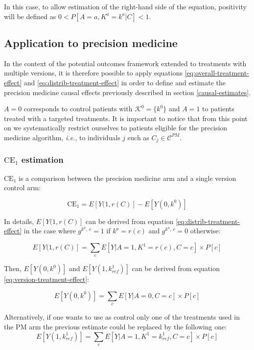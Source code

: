 \documentclass[a4paper,12pt,twoside,onecolumn,openright,final,oldfontcommands]{memoir}
\begin{document}
In this case, to allow estimation of the right-hand side of the
equation, positivity will be defined as \(0<P[A=a, K^a=k^a|C]<1\).

\subsection{Application to precision
medicine}\label{identification_causal_PM}

In the context of the potential outcomes framework extended to
treatments with multiple versions, it is therefore possible to apply
equations \eqref{eq:overall-treatment-effect} and
\eqref{eq:distrib-treatment-effect} in order to define and estimate the
precision medicine causal effects previously described in section
\ref{causal-estimates}.

\(A=0\) corresponds to control patients with \(\mathcal{K}^0=\{k^0\}\)
and \(A=1\) to patients treated with a targeted treatments. It is
important to notice that from this point on we systematically restrict
ourselves to patients eligible for the precision medicine algorithm,
\emph{i.e.}, to individuals \(j\) such as \(C_j \in \mathcal{C}^{PM}\).

\subsubsection{\texorpdfstring{\(\text{CE}_1\)
estimation}{\textbackslash{}text\{CE\}\_1 estimation}}\label{textce_1-estimation}

\(\text{CE}_1\) is a comparison between the precision medicine arm and a
single version control arm:

\begin{equation}
\text{CE}_1 = E[Y(1, r(C)] - E[Y(0, k^0)]
\label{eq:CE1}
\end{equation}

In details, \(E[Y(1, r(C)]\) can be derived from equation
\eqref{eq:distrib-treatment-effect} in the case where \(g^{k^a,~c}=1\) if
\(k^a=r(c)\) and \(g^{k^a,~c}=0\) otherwise:

\[E[Y(1, r(C)] = \sum_{c} E[Y | A=1,K^1=r(c), C=c] \times P[c]\]

Then, \(E[Y(0, k^0)]\) and \(E[Y(1, k^1_{ref})]\) can be derived from
equation \eqref{eq:version-treatment-effect}:

\[ E[Y(0, k^0)] = \sum_{c} E[Y | A=0, C=c] \times P[c] \]

Alternatively, if one wants to use as control only one of the treatments
used in the PM arm the previous estimate could be replaced by the
following one:
\[E[Y(1, k^1_{ref})] = \sum_{c} E[Y | A=1,K^1=k^1_{ref}, C=c] \times P[c]\]
\end{document}
